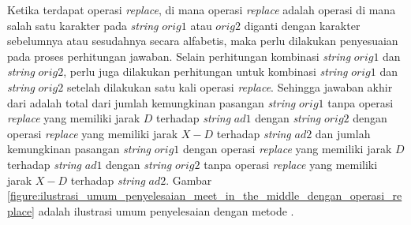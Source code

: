 Ketika terdapat operasi \textit{replace}, di mana operasi \textit{replace} adalah operasi di mana salah satu karakter pada \textit{string} $ orig1 $ atau $ orig2 $ diganti dengan karakter sebelumnya atau sesudahnya secara alfabetis, maka perlu dilakukan penyesuaian pada proses perhitungan jawaban. Selain perhitungan kombinasi \textit{string} $ orig1 $ dan \textit{string} $ orig2 $, perlu juga dilakukan perhitungan untuk kombinasi \textit{string} $ orig1 $ dan \textit{string} $ orig2 $ setelah dilakukan satu kali operasi \textit{replace}. Sehingga jawaban akhir dari \problem{} adalah total dari jumlah kemungkinan pasangan \textit{string} $ orig1 $ tanpa operasi \textit{replace} yang memiliki jarak $ D $ terhadap \textit{string} $ ad1 $ dengan \textit{string} $ orig2 $ dengan operasi \textit{replace} yang memiliki jarak $ X - D $ terhadap \textit{string} $ ad2 $ dan jumlah kemungkinan pasangan \textit{string} $ orig1 $ dengan operasi \textit{replace} yang memiliki jarak $ D $ terhadap \textit{string} $ ad1 $ dengan \textit{string} $ orig2 $ tanpa operasi \textit{replace} yang memiliki jarak $ X - D $ terhadap \textit{string} $ ad2 $. Gambar \ref{figure:ilustrasi_umum_penyelesaian_meet_in_the_middle_dengan_operasi_replace} adalah ilustrasi umum penyelesaian \problem{} dengan metode \meetinthemiddle{}.

